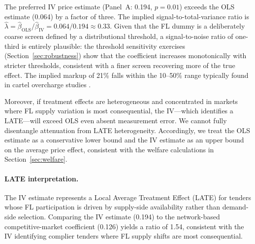 



The preferred IV price estimate (Panel~A: 0.194, $p = 0.01$) exceeds
the OLS estimate (0.064) by a factor of three. The implied
signal-to-total-variance ratio is %
$\hat{\lambda} = \hat{\beta}_{\text{OLS}} / \hat{\beta}_{\text{IV}}
= 0.064 / 0.194 \approx 0.33$.
Given that the FL dummy is a deliberately coarse screen defined by a
distributional threshold, a signal-to-noise ratio of one-third is
entirely plausible: the threshold sensitivity exercises
(Section~\ref{sec:robustness}) show that the coefficient increases
monotonically with stricter thresholds, consistent with a finer screen
recovering more of the true effect. The implied markup of 21\% falls
within the 10--50\% range typically found in cartel overcharge studies
\citep{connor2007price}.

Moreover, if treatment effects are heterogeneous and concentrated in
markets where FL supply variation is most consequential, the
IV---which identifies a LATE---will exceed OLS even absent measurement
error. We cannot fully disentangle attenuation from LATE heterogeneity.
Accordingly, we treat the OLS estimate as a conservative lower bound and
the IV estimate as an upper bound on the average price effect, consistent
with the welfare calculations in Section~\ref{sec:welfare}.

\paragraph{LATE interpretation.}
The IV estimate represents a Local Average Treatment Effect
(LATE) for tenders whose FL participation is driven by supply-side
availability rather than demand-side selection. Comparing the IV
estimate (0.194) to the network-based competitive-market coefficient
(0.126) yields a ratio of 1.54, consistent with the IV identifying
complier tenders where FL supply shifts are most consequential.

